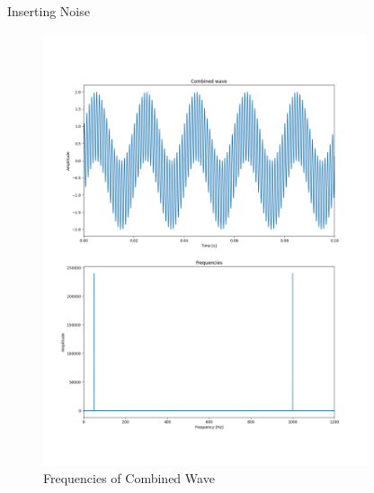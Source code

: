 \begin{hwkProblem}{6.1}{Inserting Noise}
	\newpage
	\solpart

	\begin{figure}[ht!]
	  \centering
	  \includegraphics[width=0.85\textwidth]{./6.1.3.png}
	  \caption{Frequencies of Combined Wave}
	\end{figure}

	\newpage
	\solpart


\end{hwkProblem}
